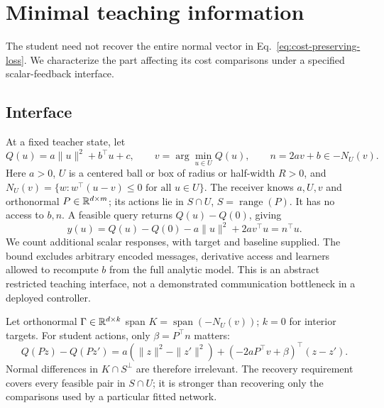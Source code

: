 \section{Minimal teaching information}\label{sec:minimal-information}
The student need not recover the entire normal vector in
Eq.~\eqref{eq:cost-preserving-loss}. We characterize the part affecting
its cost comparisons under a specified scalar-feedback interface.

\subsection{Interface}
At a fixed teacher state, let
\begin{equation}\label{eq:minimal-model}
 Q(u)=a\|u\|^2+b^\top u+c,\qquad
 v=\arg\min_{u\in U}Q(u),\qquad n=2av+b\in-N_U(v).
\end{equation}
Here $a>0$, $U$ is a centered ball or box of radius or half-width $R>0$, and
$N_U(v)=\{w:w^\top(u-v)\leq0\text{ for all }u\in U\}$.
The receiver knows $a,U,v$ and orthonormal $P\in\mathbb R^{d\times m}$;
its actions lie in $S\cap U$, $S=\operatorname{range}(P)$.
It has no access to $b,n$. A feasible query returns $Q(u)-Q(0)$, giving
\begin{equation}\label{eq:minimal-response}
 y(u)=Q(u)-Q(0)-a\|u\|^2+2av^\top u=n^\top u.
\end{equation}
We count additional scalar responses, with target and baseline supplied.
The bound excludes arbitrary encoded messages, derivative access and
learners allowed to recompute $b$ from the full analytic model.
This is an abstract restricted teaching interface, not a demonstrated
communication bottleneck in a deployed controller.

Let orthonormal $\Gamma\in\mathbb R^{d\times k}$ span
$K=\operatorname{span}(-N_U(v))$; $k=0$ for interior targets.
For student actions, only $\beta=P^\top n$ matters:
\begin{equation}\label{eq:student-normal}
 Q(Pz)-Q(Pz')=a(\|z\|^2-\|z'\|^2)
       +(-2aP^\top v+\beta)^\top(z-z').
\end{equation}
Normal differences in $K\cap S^\perp$ are therefore irrelevant.
The recovery requirement covers every feasible pair in $S\cap U$;
it is stronger than recovering only the comparisons used by a
particular fitted network.

